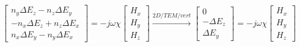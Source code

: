 \documentclass{article}
\newcommand{\dE}{\Delta E}
\newcommand{\0}{\varnothing}
\begin{document}
\begin{align*}
    \left[
    \begin{array}{c}
    n_y \dE_z - n_z \dE_y\\ 
    -n_x \dE_z + n_z \dE_x\\
    n_x \dE_y - n_y \dE_x
    \end{array} \right] = 
    -j \omega \chi 
    \left[
    \begin{array}{c}
     H_x\\
     H_y\\
     H_z
     \end{array} \right]
     \xrightarrow{2D/TEM/vert}
    \left[
    \begin{array}{c}
    0\\ 
    -\dE_z\\
    \dE_y
    \end{array} \right] = 
    -j \omega \chi 
    \left[
    \begin{array}{c}
     H_x\\
     H_y\\
     H_z
     \end{array} \right]
\end{align*}
\end{document}
